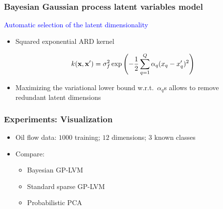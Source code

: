 \documentclass{beamer}
\begin{document}
\frame
{
\frametitle{Bayesian Gaussian process latent variables model}


\textcolor{blue}{Automatic selection of the latent dimensionality}

\begin{itemize} 



\item Squared exponential ARD kernel

$$
k(\mathbf{x},\mathbf{x}') = \sigma_f^2 \exp\left( - \frac{1}{2} \sum_{q=1}^Q
\alpha_q (x_q - x_q')^2 \right)
$$


\item Maximizing the variational lower bound w.r.t.\ 
      $\alpha_q$s allows to remove  
      redundant latent dimensions   

\end{itemize}

}


\frame
{
\frametitle{Experiments: Visualization}


\begin{itemize}


\item  Oil flow data: $1000$ training; $12$ dimensions; 3 known classes


\item Compare: 


 \begin{itemize} 

 \item Bayesian GP-LVM

\item Standard sparse GP-LVM 

\item Probabilistic PCA 
 
 \end{itemize}

 \end{itemize}

}
\end{document}
